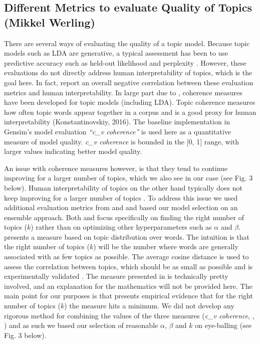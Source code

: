 \documentclass{article}
\begin{document}
    \subsection{Different Metrics to evaluate Quality of Topics (Mikkel Werling)}
There are several ways of evaluating the quality of a topic model. Because topic models such as LDA are generative, a typical assessment has been to use predictive accuracy such as held-out likelihood and perplexity \cite{chang2009reading}. However, these evaluations do not directly address human interpretability of topics, which is the goal here. In fact,  report an overall negative correlation between these evaluation metrics and human interpretability. In large part due to , coherence measures have been developed for topic models (including LDA). Topic coherence measures how often topic words appear together in a corpus and is a good proxy for human interpretability (Konstantinovskiy, 2016). The baseline implementation in Gensim’s model evaluation \textit{“c\_v coherence”} is used here as a quantitative measure of model quality. \textit{c\_v coherence} is bounded in the [0, 1] range, with larger values indicating better model quality. 

An issue with coherence measures however, is that they tend to continue improving for a larger number of topics, which we also see in our case (see Fig. 3 below). Human interpretability of topics on the other hand typically does not keep improving for a larger number of topics \cite{chang2009reading}. To address this issue we used additional evaluation metrics from  and  and based our model selection on an ensemble approach. Both  and  focus specifically on finding the right number of topics ($k$) rather than on optimizing other hyperparameters such as $\alpha$ and $\beta$.  presents a measure based on topic distribution over words. The intuition is that the right number of topics ($k$) will be the number where words are generally associated with as few topics as possible. The average cosine distance is used to assess the correlation between topics, which should be as small as possible and is experimentally validated \cite{cao2009density}. The measure presented in  is technically pretty involved, and an explanation for the mathematics will not be provided here. The main point for our purposes is that  presents empirical evidence that for the right number of topics ($k$) the measure hits a minimum. We did not develop any rigorous method for combining the values of the three measures (\textit{c\_v coherence}, \cite{cao2009density}, \cite{arun2010finding}) and as such we based our selection of reasonable $\alpha$, $\beta$ and $k$ on eye-balling (see Fig. 3 below). 
\end{document}
